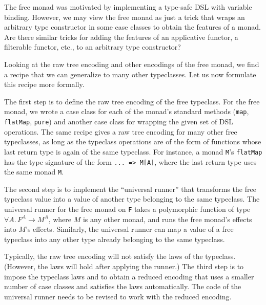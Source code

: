 The free monad was motivated by implementing a type-safe DSL with
variable binding. However, we may view the free monad as just a trick
that wraps an arbitrary type constructor in some case classes to obtain
the features of a monad. Are there similar tricks for adding the features
of an applicative functor, a filterable functor, etc., to an arbitrary
type constructor? 

Looking at the raw tree encoding and other encodings of the free monad,
we find a recipe that we can generalize to many other typeclasses.
Let us now formulate this recipe more formally.

The first step is to define the raw tree encoding of the free typeclass.
For the free monad, we wrote a case class for each of the monad\textsf{'}s
standard methods (\lstinline!map!,
\lstinline!flatMap!, \lstinline!pure!)
and another case class for wrapping the given set of DSL operations.
The same recipe gives a raw tree encoding for many other free typeclasses,
as long as the typeclass operations are of the form of functions whose
last return type is again of the same typeclass. For instance, a monad
\lstinline!M!\textsf{'}s \lstinline!flatMap!
has the type signature of the form \lstinline!... => M[A]!,
where the last return type uses the same monad \lstinline!M!.

The second step is to implement the \textsf{``}universal runner\textsf{''} that transforms
the free typeclass value into a value of another type belonging to
the same typeclass. The universal runner for the free monad on \lstinline!F!
takes a polymorphic function of type $\forall A.\,F^{A}\rightarrow M^{A}$,
where $M$ is any other monad, and runs the free monad\textsf{'}s effects into
$M$\textsf{'}s effects. Similarly, the universal runner can map a value of
a free typeclass into any other type already belonging to the same
typeclass.

Typically, the raw tree encoding will not satisfy the laws of the
typeclass. (However, the laws will hold after applying the runner.)
The third step is to impose the typeclass laws and to obtain a reduced
encoding that uses a smaller number of case classes and satisfies
the laws automatically. The code of the universal runner needs to
be revised to work with the reduced encoding.

